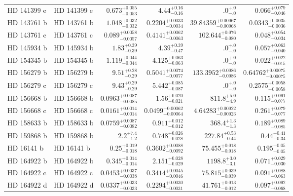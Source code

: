 \begin{longtable*}{llrrrr}
HD 141399 e & HD 141399 e & $0.673^{+0.055}_{-0.053}$ & $4.44^{+0.16}_{-0.16}$ & $.0^{+.0}_{-.0}$ & $0.066^{+0.079}_{-0.046}$ \\ 
HD 143761 b & HD 143761 b & $1.048^{+0.032}_{-0.032}$ & $0.2204^{+0.0033}_{-0.0034}$ & $39.84359^{+0.00067}_{-0.00068}$ & $0.0343^{+0.0035}_{-0.0036}$ \\ 
HD 143761 c & HD 143761 c & $0.089^{+0.0058}_{-0.0057}$ & $0.4141^{+0.0062}_{-0.0063}$ & $102.644^{+0.076}_{-0.080}$ & $0.048^{+0.054}_{-0.034}$ \\ 
HD 145934 b & HD 145934 b & $1.83^{+0.39}_{-0.39}$ & $4.39^{+0.39}_{-0.47}$ & $.0^{+.0}_{-.0}$ & $0.057^{+0.063}_{-0.040}$ \\ 
HD 154345 b & HD 154345 b & $1.119^{+0.044}_{-0.044}$ & $4.125^{+0.063}_{-0.063}$ & $.0^{+.0}_{-.0}$ & $0.022^{+0.022}_{-0.015}$ \\ 
HD 156279 b & HD 156279 b & $9.51^{+0.28}_{-0.29}$ & $0.5041^{+0.0074}_{-0.0077}$ & $133.3952^{+0.0086}_{-0.0086}$ & $0.64762^{+0.00075}_{-0.00075}$ \\ 
HD 156279 c & HD 156279 c & $9.43^{+0.29}_{-0.29}$ & $5.442^{+0.085}_{-0.087}$ & $.0^{+.0}_{-.0}$ & $0.2575^{+0.0058}_{-0.0058}$ \\ 
HD 156668 b & HD 156668 b & $0.0963^{+0.0087}_{-0.0085}$ & $1.56^{+0.020}_{-0.021}$ & $811.8^{+5.0}_{-4.9}$ & $0.115^{+0.091}_{-0.077}$ \\ 
HD 156668 c & HD 156668 c & $0.0161^{+0.0014}_{-0.0014}$ & $0.0499^{+0.00062}_{-0.00064}$ & $4.64283^{+0.00022}_{-0.00023}$ & $0.261^{+0.079}_{-0.077}$ \\ 
HD 158633 b & HD 158633 b & $0.0759^{+0.0087}_{-0.0082}$ & $0.911^{+0.012}_{-0.012}$ & $368.4^{+1.3}_{-1.3}$ & $0.189^{+0.089}_{-0.085}$ \\ 
HD 159868 b & HD 159868 b & $2.2^{+7.4}_{-1.2}$ & $0.748^{+0.026}_{-0.028}$ & $227.84^{+0.53}_{-0.44}$ & $0.44^{+0.41}_{-0.34}$ \\ 
HD 16141 b & HD 16141 b & $0.25^{+0.019}_{-0.018}$ & $0.3602^{+0.0088}_{-0.0092}$ & $75.455^{+0.018}_{-0.018}$ & $0.195^{+0.05}_{-0.05}$ \\ 
HD 164922 b & HD 164922 b & $0.345^{+0.014}_{-0.014}$ & $2.151^{+0.028}_{-0.029}$ & $1198.8^{+3.0}_{-3.1}$ & $0.071^{+0.029}_{-0.030}$ \\ 
HD 164922 c & HD 164922 c & $0.0453^{+0.0037}_{-0.0038}$ & $0.3414^{+0.0045}_{-0.0046}$ & $75.815^{+0.039}_{-0.039}$ & $0.091^{+0.088}_{-0.063}$ \\ 
HD 164922 d & HD 164922 d & $0.0337^{+0.0033}_{-0.0033}$ & $0.2294^{+0.0030}_{-0.0031}$ & $41.761^{+0.013}_{-0.012}$ & $0.097^{+0.092}_{-0.068}$ \\ 

\end{longtable*}
